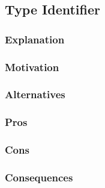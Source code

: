 \subsection{Type Identifier}
\subsubsection{Explanation}

\subsubsection{Motivation}

\subsubsection{Alternatives}

\subsubsection{Pros}

\subsubsection{Cons}

\subsubsection{Consequences}

